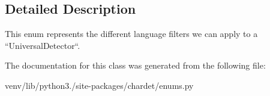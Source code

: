 \subsection{Detailed Description}
\begin{DoxyVerb}This enum represents the different language filters we can apply to a
``UniversalDetector``.
\end{DoxyVerb}
 

The documentation for this class was generated from the following file\+:\begin{DoxyCompactItemize}
\item 
venv/lib/python3./site-\/packages/chardet/enums.\+py\end{DoxyCompactItemize}
